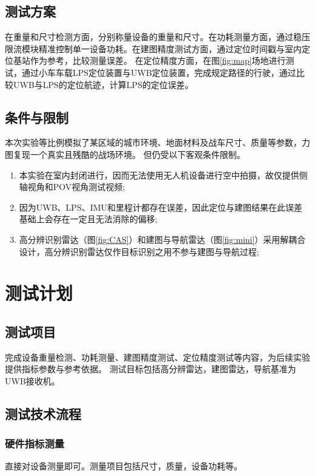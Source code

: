 \documentclass[lang=cn,11pt,a4paper]{elegantpaper}
\begin{document}
\subsection{测试方案}
在重量和尺寸检测方面，分别称量设备的重量和尺寸。在功耗测量方面，通过稳压限流模块精准控制单一设备功耗。在建图精度测试方面，通过定位时间戳与室内定位基站作为参考，比较测量误差。
在定位精度方面，在图\ref{fig:map}场地进行测试，通过小车车载LPS定位装置与UWB定位装置，完成规定路径的行驶，通过比较UWB与LPS的定位航迹，计算LPS的定位误差。

\subsection{条件与限制}
本次实验等比例模拟了某区域的城市环境、地面材料及战车尺寸、质量等参数，力图复现一个真实且残酷的战场环境。
但仍受以下客观条件限制。
\begin{enumerate}
  \item  本实验在室内封闭进行，因而无法使用无人机设备进行空中拍摄，故仅提供侧轴视角和POV视角测试视频;
  \item  因为UWB、LPS、IMU和里程计都存在误差，因此定位与建图结果在此误差基础上会存在一定且无法消除的偏移;
  \item  高分辨识别雷达（图\ref{fig:CAS}）和建图与导航雷达（图\ref{fig:mini}）采用解耦合设计，高分辨识别雷达仅作目标识别之用不参与建图与导航过程;
\end{enumerate}

\section{测试计划}

\subsection{测试项目}
完成设备重量检测、功耗测量、建图精度测试、定位精度测试等内容，为后续实验提供指标参数与参考依据。
测试目标包括高分辨雷达，建图雷达，导航基准为UWB接收机。

\subsection{测试技术流程}

\subsubsection{硬件指标测量}
直接对设备测量即可。测量项目包括尺寸，质量，设备功耗等。
\end{document}
